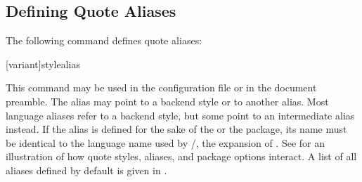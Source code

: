 \documentclass{ltxdockit}[2010/09/26]
\begin{document}
\subsection{Defining Quote Aliases}
\label{cfg:als}

The following command defines quote aliases:

\begin{ltxsyntax}

[variant]{style}{alias}

This command may be used in the configuration file or in the document preamble. The alias may point to a backend style or to another alias. Most language aliases refer to a backend style, but some point to an intermediate alias instead. If the alias is defined for the sake of the  or the  package, its name must be identical to the language name used by \slash{}, \ie the expansion of . See  for an illustration of how quote styles, aliases, and package options interact. A list of all aliases defined by default is given in .

\end{ltxsyntax}
\end{document}
